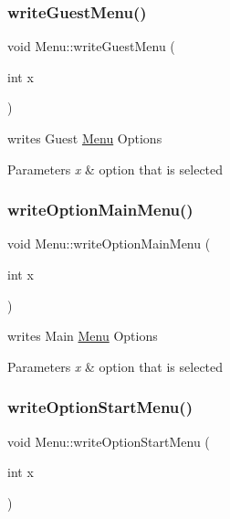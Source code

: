 \subsubsection{\texorpdfstring{write\+Guest\+Menu()}{writeGuestMenu()}}
{\footnotesize\ttfamily void Menu\+::write\+Guest\+Menu (\begin{DoxyParamCaption}\item[{int}]{x }\end{DoxyParamCaption})}



writes Guest \hyperlink{class_menu}{Menu} Options 


\begin{DoxyParams}{Parameters}
{\em x} & option that is selected \\
\hline
\end{DoxyParams}
\hypertarget{class_menu_a27065457645afe85598070c8d009b439}{}\label{class_menu_a27065457645afe85598070c8d009b439} 
\subsubsection{\texorpdfstring{write\+Option\+Main\+Menu()}{writeOptionMainMenu()}}
{\footnotesize\ttfamily void Menu\+::write\+Option\+Main\+Menu (\begin{DoxyParamCaption}\item[{int}]{x }\end{DoxyParamCaption})}



writes Main \hyperlink{class_menu}{Menu} Options 


\begin{DoxyParams}{Parameters}
{\em x} & option that is selected \\
\hline
\end{DoxyParams}
\hypertarget{class_menu_acc70f0214e040f8efae051c01f523994}{}\label{class_menu_acc70f0214e040f8efae051c01f523994} 
\subsubsection{\texorpdfstring{write\+Option\+Start\+Menu()}{writeOptionStartMenu()}}
{\footnotesize\ttfamily void Menu\+::write\+Option\+Start\+Menu (\begin{DoxyParamCaption}\item[{int}]{x }\end{DoxyParamCaption})}



